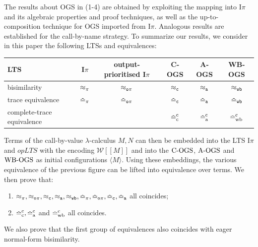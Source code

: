 \documentclass[11pt,a4paper]{amsart}
\theoremstyle{plain}
\theoremstyle{definition}
\theoremstyle{defC}
\theoremstyle{thmC}
\theoremstyle{plain}
\numberwithin{equation}{section}
\newcommand{\AOGS}{\mbox{{\rm A-OGS}}\xspace}      %
\newcommand{\COGS}{\mbox{{\rm C-OGS}}\xspace}      %
\newcommand{\WBOGS}{\mbox{{\rm WB-OGS}}\xspace}      %
\newcommand{\rmm}[1]{{\tt{\lowercase{#1}}}}
\newcommand{\opLTS}{opLTS\xspace}  %
\newcommand{\genTE}[1]{\mathrel{\bumpeq_{\rmm{\lowercase{#1}}}}}       %
\newcommand{\genwb}[1]{\mathrel{\approx_{\rmm{\lowercase{#1}}}}}       %
\newcommand{\wbPI}{\genwb{\pi}}       %
\newcommand{\wbOPI}{\genwb{o\pi}}       %
\newcommand{\wbC}{\genwb{C}}       %
\newcommand{\wbA}{\genwb{A}}       %
\newcommand{\wbWB}{\genwb{wb}}       %
\newcommand{\TEPI}{\genTE{\pi}}       %
\newcommand{\TEN}{\genTE{o\pi}}     %
\newcommand{\TEA}{\genTE{A}}       %
\newcommand{\TEp}{\genTE{C}}       %
\newcommand{\TEwb}{\genTE{wb}}       %
\newcommand{\genTEcomp}[1]{\mathrel{\bumpeq^{\rm c}_{\rm{\lowercase{#1}}}}} %
\newcommand{\TEwbc}{\genTEcomp{WB}}       %
\newcommand{\TEc}{\genTEcomp{A}}        %
\newcommand{\TEpc}{\genTEcomp{C}}        %
\newcommand{\encoW}[1]{\cbvSymbNoLin [\! [ #1 ] \! ]  }
\newcommand{\cbvSymbNoLin}{{\mathcal {W}}}
\newcommand{\Intp}{\mbox{I$\pi$}\xspace}   %
\newcommand{\piI}{\Intp}   %
\newcommand{\conf}[1]{\langle #1\rangle}
\theoremstyle{plain}
\theoremstyle{definition}
\begin{document}
\noindent
The results about OGS in (1-4) are obtained by exploiting
  the mapping  into \piI and  its algebraic  properties and proof techniques, as well as  
the up-to-composition technique for OGS imported from \piI.
Analogous results are established for the call-by-name strategy.
To summarize our results, we consider in this paper the following LTSs and equivalences:
\begin{center}
\begin{tabular}{@{}lccccc@{}}
  \toprule
  LTS & \piI & {\small output-prioritised} \piI & \COGS & \AOGS & \WBOGS \\
  \midrule
  bisimilarity & $\wbPI$ & $\wbOPI$ & $\wbC$ & $\wbA$ & $\wbWB$ \\
  trace equivalence & $\TEPI$ & $\TEN$ & $\TEp$ & $\TEA$ & $\TEwb$ \\
  complete-trace equivalence & & & $\TEpc$ & $\TEc$ & $\TEwbc$ \\
  \bottomrule
\end{tabular}
\end{center}
Terms of the call-by-value $\lambda$-calculus $M,N$ can then be embedded into the LTS $\piI$ and $\opLTS$ with the encoding
$\encoW M$ and into the $\COGS$, $\AOGS$ and $\WBOGS$ as initial configurations $\conf M$.
Using these embeddings, the various equivalence of the previous figure can be lifted into equivalence over terms.
We then prove that:
\begin{enumerate}
\item $\wbPI, \wbOPI, \wbC, \wbA, \wbWB, \TEPI, \TEN, \TEp, \TEA$ all coincides;
\item $\TEpc, \TEc$ and $\TEwbc$ all coincides.
\end{enumerate}
We also prove that the first group of equivalences also coincides with eager normal-form bisimilarity.
\end{document}
